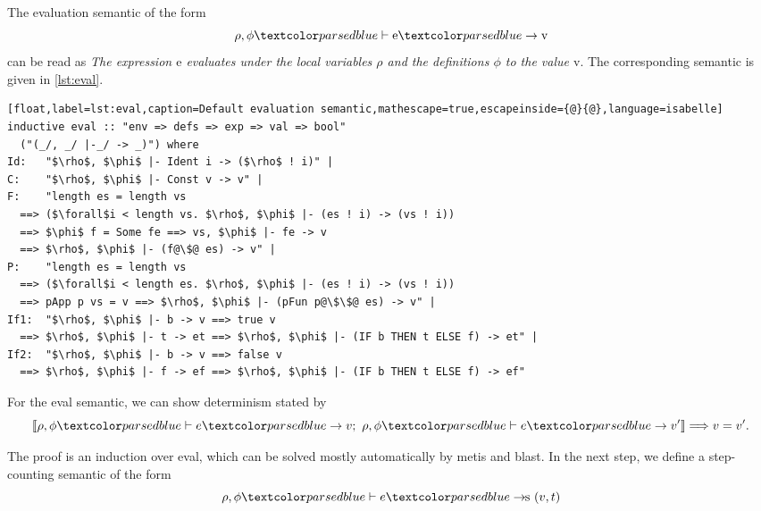 The evaluation semantic of the form
\begin{equation*}
  \rho, \phi \hvdash \text{e} \hrightarrow \text{v}
\end{equation*}
can be read as \textit{The expression $\text{e}$ evaluates under the local variables $\rho$ and the definitions $\phi$ to the value $\text{v}$}. The corresponding semantic is given in \autoref{lst:eval}.
\begin{lstlisting}[float,label=lst:eval,caption=Default evaluation semantic,mathescape=true,escapeinside={@}{@},language=isabelle]
inductive eval :: "env => defs => exp => val => bool"
  ("(_/, _/ |-_/ -> _)") where
Id:   "$\rho$, $\phi$ |- Ident i -> ($\rho$ ! i)" |
C:    "$\rho$, $\phi$ |- Const v -> v" |
F:    "length es = length vs
  ==> ($\forall$i < length vs. $\rho$, $\phi$ |- (es ! i) -> (vs ! i))
  ==> $\phi$ f = Some fe ==> vs, $\phi$ |- fe -> v
  ==> $\rho$, $\phi$ |- (f@\$@ es) -> v" |
P:    "length es = length vs
  ==> ($\forall$i < length es. $\rho$, $\phi$ |- (es ! i) -> (vs ! i))
  ==> pApp p vs = v ==> $\rho$, $\phi$ |- (pFun p@\$\$@ es) -> v" |
If1:  "$\rho$, $\phi$ |- b -> v ==> true v
  ==> $\rho$, $\phi$ |- t -> et ==> $\rho$, $\phi$ |- (IF b THEN t ELSE f) -> et" |
If2:  "$\rho$, $\phi$ |- b -> v ==> false v
  ==> $\rho$, $\phi$ |- f -> ef ==> $\rho$, $\phi$ |- (IF b THEN t ELSE f) -> ef"
\end{lstlisting}

For the eval semantic, we can show determinism stated by
\begin{equation*}
 \llbracket \rho, \phi \hvdash e \hrightarrow v; \text{ } \rho, \phi \hvdash e \hrightarrow v' \rrbracket \Longrightarrow v = v'.
\end{equation*}

The proof is an induction over eval, which can be solved mostly automatically by metis and blast.
In the next step, we define a step-counting semantic of the form
\begin{equation*}
  \rho, \phi \hvdash e \hrightarrows (v,t)
\end{equation*}

